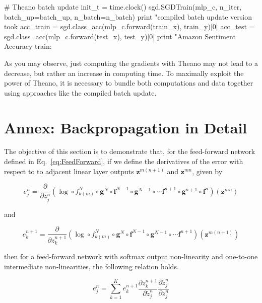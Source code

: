\begin{exercise}
\begin{python}
# Theano batch update
init_t = time.clock()
sgd.SGDTrain(mlp_c, n_iter, batch_up=batch_up, n_batch=n_batch)
print "\nTheano compiled batch update version took %
acc_train = sgd.class_acc(mlp_c.forward(train_x), train_y)[0]
acc_test  = sgd.class_acc(mlp_c.forward(test_x), test_y)[0]
print "Amazon Sentiment Accuracy train: %
\end{python}
As you may observe, just computing the gradients with Theano may not lead to
a decrease, but rather an increase in computing time. To maximally exploit
the power of Theano, it is necessary to bundle both computations and data 
together using approaches like the compiled batch update.
\end{exercise}

\section*{Annex: Backpropagation in Detail}

The objective of this section is to demonstrate that, for the feed-forward
network defined in Eq.~\ref{eq:FeedForward}, if we define the derivatives of
the error with respect to to adjacent linear layer outputs
$\mathbf{z}^{m(n+1)}$ and $\mathbf{z}^{mn}$, given by

\begin{equation}
e^{n}_j = \frac{\partial}{\partial z^{n}_{j}} (\log \circ f_{k(m)}^N \circ \mathbf{g}^N \circ \mathbf{f}^{N-1} \circ \mathbf{g}^{N-1} \circ \cdots \mathbf{f}^{n+1} \circ \mathbf{g}^{n+1} \circ \mathbf{f}^{n})(\mathbf{z}^{mn}) 
\label{eq:endetail}
\end{equation}

\noindent and 

\begin{equation}
e^{n+1}_k = \frac{\partial}{\partial z^{n+1}_{k}} (\log \circ f_{k(m)}^N \circ \mathbf{g}^N \circ \mathbf{f}^{N-1} \circ \mathbf{g}^{N-1} \circ \cdots \mathbf{f}^{n+1})(\mathbf{z}^{m(n+1)})
\label{eq:enp1detail}
\end{equation}

\noindent then for a feed-forward network with softmax output non-linearity and one-to-one intermediate non-linearities, the following relation holds. 

\begin{equation}
e^{n}_j = \sum_{k=1}^K e^{n+1}_k \frac{\partial z^{n+1}_k}{\partial \tilde{z}_{j}^n}\frac{\partial \tilde{z}^n_{j}}{\partial z_{j}^n} 
\label{eq:DetailchainRulRecursion}
\end{equation}

